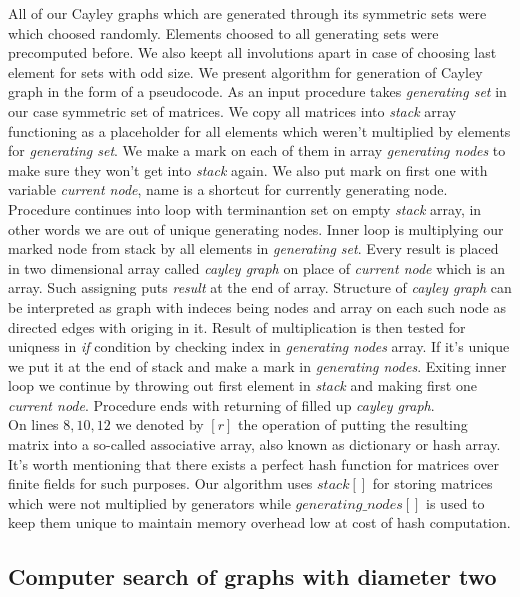 \documentclass[a4paper,12pt,oneside]{report}%
\begin{document}
All of our Cayley graphs which are generated through its symmetric sets were which choosed randomly. Elements choosed to all generating sets were precomputed before. We also keept all involutions apart in case of choosing last element for sets with odd size. We present algorithm for generation of Cayley graph in the form of a pseudocode. 
As an input procedure takes {\em generating set} in our case symmetric set of matrices. We copy all matrices into {\em stack} array functioning as a placeholder for all elements which weren't multiplied by elements for {\em generating set}. We make a mark on each of them in array {\em generating nodes} to make sure they won't get into {\em stack} again. We also put mark on first one with variable {\em current node}, name is a shortcut for currently generating node. Procedure continues into loop with terminantion set on empty {\em stack} array, in other words we are out of unique generating nodes. Inner loop is multiplying our marked node from stack by all elements in {\em generating set}. Every result is placed in two dimensional array called {\em cayley graph} on place of {\em current node} which is an array. Such assigning puts {\em result} at the end of array. Structure of {\em cayley graph} can be interpreted as graph with indeces being nodes and array on each such node as directed edges with origing in it. Result of multiplication is then tested for uniqness in {\em if} condition by checking index in {\em generating nodes} array. If it's unique we put it at the end of stack and make a mark in {\em generating nodes}. Exiting inner loop we continue by throwing out first element in {\em stack} and making first one {\em current node}. Procedure ends with returning of filled up {\em cayley graph}.  ~\\



On lines $8,10,12$ we denoted by $[ r ]$  the operation of putting the resulting matrix into a so-called associative array, also known as dictionary or hash array. It's worth mentioning that there exists a perfect hash function for matrices over finite fields for such purposes. Our algorithm uses $stack[]$ for storing matrices which were not multiplied by generators  while $generating\_nodes[]$ is used to keep them unique to maintain memory overhead low at cost of hash computation.



\subsection{Computer search of graphs with diameter two}
\end{document}
